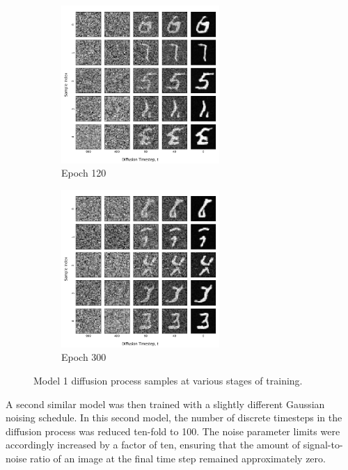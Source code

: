 \documentclass[12pt]{article}
\begin{document}
\begin{figure}[hp]
    \begin{subfigure}{0.49\textwidth}
    \includegraphics[width=0.9\linewidth, height=6cm, center]{figures/diffusion_plot_1_0120.png}
    \caption{Epoch 120}
    \label{fig:1_120}
    \end{subfigure}
    \begin{subfigure}{0.49\textwidth}
    \includegraphics[width=0.9\linewidth, height=6cm, center]{figures/diffusion_plot_1_0300.png}
    \caption{Epoch 300}
    \label{fig:1_300}
    \end{subfigure}

    \caption{Model 1 diffusion process samples at various stages of training.}
    \label{fig:diffusion_1}
\end{figure}

A second similar model was then trained with a slightly different Gaussian noising schedule.
In this second model, the number of discrete timesteps in the diffusion process was reduced ten-fold to 100.
The noise parameter limits were accordingly increased by a factor of ten, ensuring that the amount of signal-to-noise ratio of an image at the final time step remained approximately zero.
\end{document}
